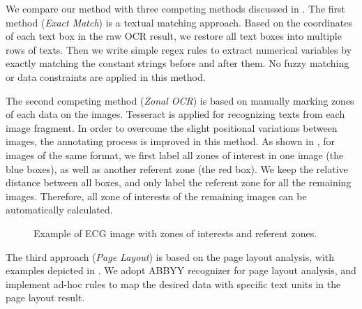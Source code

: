 We compare our method with three competing methods discussed in .
The first method (\textit{Exact Match}) is a textual matching approach.
Based on the coordinates of each text box in the raw OCR result,
we restore all text boxes into multiple rows of texts.
Then we write simple regex rules to extract numerical variables
by exactly matching the constant strings before and after them.
No fuzzy matching or data constraints are applied in this method.

The second competing method (\textit{Zonal OCR}) is based on
manually marking zones of each data on the images.
Tesseract is applied for recognizing texts from each image fragment.
In order to overcome the slight positional variations between images,
the annotating process is improved in this method.
As shown in , for images of the same format,
we first label all zones of interest in one image (the blue boxes),
as well as another referent zone (the red box).
We keep the relative distance between all boxes,
and only label the referent zone for all the remaining images.
Therefore, all zone of interests of the remaining images
can be automatically calculated.
\begin{figure}[ht]
\centering
{}
\caption{Example of ECG image with zones of interests and referent zones.}
\label{fig:zOCR}
\end{figure}

The third approach (\textit{Page Layout}) is based on the page layout analysis,
with examples depicted in .
We adopt ABBYY recognizer for page layout analysis,
and implement ad-hoc rules to map the desired data with specific text units
in the page layout result.



